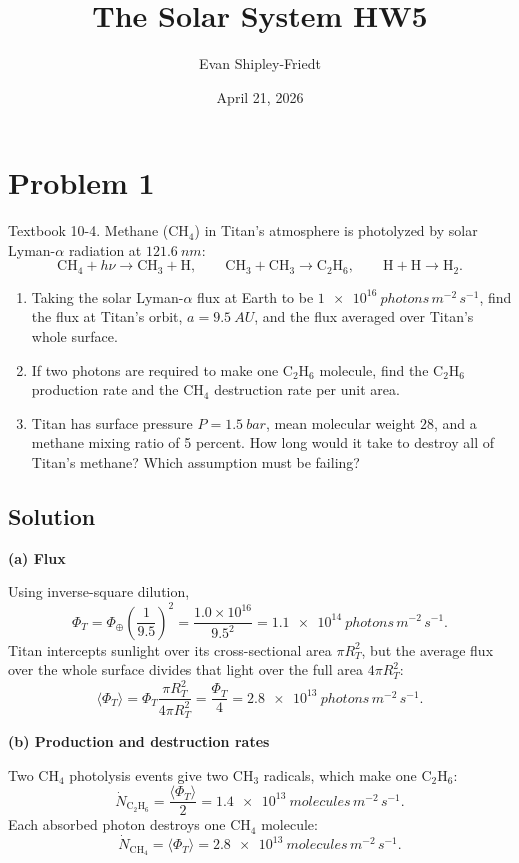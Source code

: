\documentclass[11pt]{article}
\title{The Solar System HW5}
\author{Evan Shipley-Friedt}
\date{April 21, 2026}
\begin{document}
\maketitle

\section*{Problem 1}
Textbook 10-4. Methane (CH$_4$) in Titan's atmosphere is photolyzed by solar Lyman-$\alpha$
radiation at $\SI{121.6}{nm}$:
\[
\mathrm{CH_4}+h\nu\to \mathrm{CH_3}+\mathrm{H},
\qquad
\mathrm{CH_3}+\mathrm{CH_3}\to \mathrm{C_2H_6},
\qquad
\mathrm{H}+\mathrm{H}\to \mathrm{H_2}.
\]
\begin{enumerate}[label=(\alph*)]
\item Taking the solar Lyman-$\alpha$ flux at Earth to be
$\SI{1e16}{photons\,m^{-2}\,s^{-1}}$, find the flux at Titan's orbit, $a=\SI{9.5}{AU}$,
and the flux averaged over Titan's whole surface.
\item If two photons are required to make one C$_2$H$_6$ molecule, find the C$_2$H$_6$
production rate and the CH$_4$ destruction rate per unit area.
\item Titan has surface pressure $P=\SI{1.5}{bar}$, mean molecular weight $28$, and a methane
mixing ratio of 5 percent. How long would it take to destroy all of Titan's methane? Which
assumption must be failing?
\end{enumerate}

\subsection*{Solution}
\textbf{(a) Flux}

Using inverse-square dilution,
\[
\Phi_T=\Phi_\oplus\left(\frac{1}{9.5}\right)^2
=\frac{1.0\times 10^{16}}{9.5^2}
=\SI{1.1e14}{photons\,m^{-2}\,s^{-1}}.
\]
Titan intercepts sunlight over its cross-sectional area $\pi R_T^2$, but the average flux over
the whole surface divides that light over the full area $4\pi R_T^2$:
\[
\langle \Phi_T\rangle=\Phi_T\frac{\pi R_T^2}{4\pi R_T^2}
=\frac{\Phi_T}{4}
=\boxed{\SI{2.8e13}{photons\,m^{-2}\,s^{-1}}}.
\]

\textbf{(b) Production and destruction rates}

Two CH$_4$ photolysis events give two CH$_3$ radicals, which make one C$_2$H$_6$:
\[
\dot N_{\mathrm{C_2H_6}}=\frac{\langle \Phi_T\rangle}{2}
=\boxed{\SI{1.4e13}{molecules\,m^{-2}\,s^{-1}}}.
\]
Each absorbed photon destroys one CH$_4$ molecule:
\[
\dot N_{\mathrm{CH_4}}=\langle \Phi_T\rangle
=\boxed{\SI{2.8e13}{molecules\,m^{-2}\,s^{-1}}}.
\]
\end{document}

